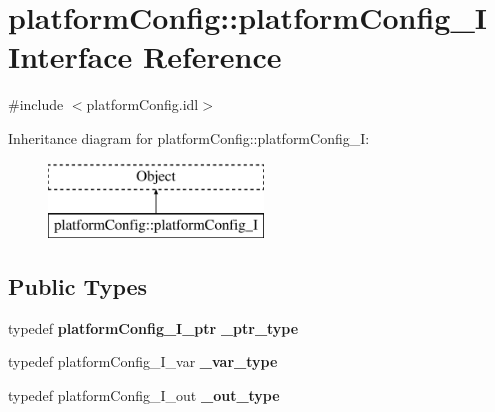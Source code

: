 \section{platform\+Config\+:\+:platform\+Config\+\_\+I Interface Reference}
\label{classplatformConfig_1_1platformConfig__I}


{\ttfamily \#include $<$platform\+Config.\+idl$>$}

Inheritance diagram for platform\+Config\+:\+:platform\+Config\+\_\+I\+:\begin{figure}[H]
\begin{center}
\leavevmode
\includegraphics[height=2.000000cm]{classplatformConfig_1_1platformConfig__I}
\end{center}
\end{figure}
\subsection*{Public Types}
\begin{DoxyCompactItemize}
\item 
typedef {\bf platform\+Config\+\_\+\+I\+\_\+ptr} {\bfseries \+\_\+ptr\+\_\+type}\label{classplatformConfig_1_1platformConfig__I_ad7a2fd10b4483c55fc4fd1e2e529df69}

\item 
typedef platform\+Config\+\_\+\+I\+\_\+var {\bfseries \+\_\+var\+\_\+type}\label{classplatformConfig_1_1platformConfig__I_ae55023f650b124ccceb6f6d364c4d357}

\item 
typedef platform\+Config\+\_\+\+I\+\_\+out {\bfseries \+\_\+out\+\_\+type}\label{classplatformConfig_1_1platformConfig__I_a814944fec3ed9ea228432235e4042b66}

\end{DoxyCompactItemize}
